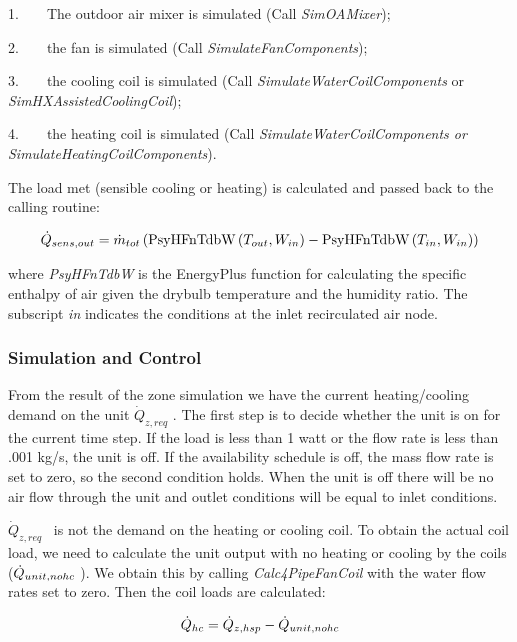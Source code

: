 1.~~~~The outdoor air mixer is simulated (Call \emph{SimOAMixer});

2.~~~~the fan is simulated (Call \emph{SimulateFanComponents});

3.~~~~the cooling coil is simulated (Call \emph{SimulateWaterCoilComponents} or \emph{SimHXAssistedCoolingCoil});

4.~~~~the heating coil is simulated (Call \emph{SimulateWaterCoilComponents or SimulateHeatingCoilComponents}).

The load met (sensible cooling or heating) is calculated and passed back to the calling routine:

\begin{equation}
  \dot{Q}_{sens,out} = \dot{m}_{tot} \PB{\text{PsyHFnTdbW}\PB{T_{out},W_{in}} - \text{PsyHFnTdbW}\PB{T_{in},W_{in}}}
\end{equation}

where \emph{PsyHFnTdbW} is the EnergyPlus function for calculating the specific enthalpy of air given the drybulb temperature and the humidity ratio. The subscript \emph{in} indicates the conditions at the inlet recirculated air node.

\subsubsection{Simulation and Control}\label{simulation-and-control-3-000}

From the result of the zone simulation we have the current heating/cooling demand on the unit \({\dot Q_{z,req}}\) . The first step is to decide whether the unit is on for the current time step. If the load is less than 1 watt or the flow rate is less than .001 kg/s, the unit is off. If the availability schedule is off, the mass flow rate is set to zero, so the second condition holds. When the unit is off there will be no air flow through the unit and outlet conditions will be equal to inlet conditions.

\({\dot Q_{z,req}}\) ~is not the demand on the heating or cooling coil. To obtain the actual coil load, we need to calculate the unit output with no heating or cooling by the coils (\({\dot Q_{unit,no{\rm{ }}hc}}\) ). We obtain this by calling \emph{Calc4PipeFanCoil} with the water flow rates set to zero. Then the coil loads are calculated:

\begin{equation}
{\dot Q_{hc}} = {\dot Q_{z,hsp}} - {\dot Q_{unit,no{\rm{ }}hc}}
\end{equation}

